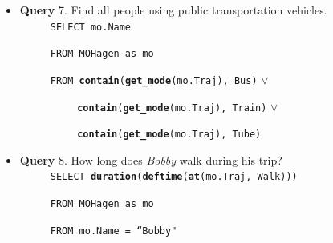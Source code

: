 \begin{itemize}
 \item \textbf{Query} 7. Find all people using public transportation vehicles. \\

$\hspace{1cm}$ \texttt{SELECT mo.Name}

$\hspace{1cm}$ \texttt{FROM MOHagen as mo}

$\hspace{1cm}$ \texttt{FROM \textbf{contain}(\textbf{get\_mode}(mo.Traj), Bus)} $\vee$

$\hspace{2cm}$ \texttt{\textbf{contain}(\textbf{get\_mode}(mo.Traj), Train)} $\vee$ 

$\hspace{2cm}$ \texttt{\textbf{contain}(\textbf{get\_mode}(mo.Traj), Tube)} \\
 
\end{itemize}

\begin{itemize}
 \item \textbf{Query} 8. How long does \textit{Bobby} walk during his trip? \\

$\hspace{1cm}$ \texttt{SELECT \textbf{duration}(\textbf{deftime}(\textbf{at}(mo.Traj, Walk)))}

$\hspace{1cm}$ \texttt{FROM MOHagen as mo}

$\hspace{1cm}$ \texttt{FROM mo.Name = ``Bobby"} \\
\end{itemize}


